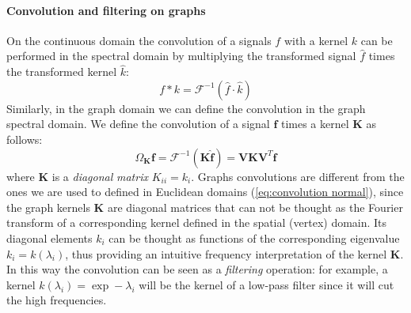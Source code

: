 \paragraph{Convolution and filtering on graphs}
On the continuous domain the convolution of a signals $f$ with a kernel $k$ can be performed in the spectral domain by multiplying the transformed signal $\hat f$ times the transformed kernel $\hat k$: 
\begin{equation}\label{eq:convolution normal}
	f*k = \mathcal F^{-1}(\hat f \cdot \hat k)
\end{equation}
Similarly, in the graph domain we can define the convolution in the graph spectral domain. We define the convolution of a signal $\mathbf f$ times a kernel $\mathbf K$ as follows:
\begin{equation}\label{eq:graph convolution}
	\Omega_\mathbf K\mathbf f = \mathcal{F}^{-1}(\mathbf K \hat {\mathbf f})= \mathbf V\mathbf K  \mathbf V^T {\mathbf f}
\end{equation}
where $\mathbf K$ is a \textit{diagonal} \textit{matrix} $K_{ii} = k_i$. Graphs convolutions are different from the ones we are used to defined in Euclidean domains (\ref{eq:convolution normal}), since the graph kernels $\mathbf K$ are diagonal matrices that can not be thought as the Fourier transform of a corresponding kernel defined in the spatial (vertex) domain. Its diagonal elements $k_{i}$ can be thought as functions of the corresponding eigenvalue $k_{i}= k(\lambda_i)$, thus providing an intuitive frequency interpretation of the kernel $\mathbf K$. In this way the convolution can be seen as a \textit{filtering} operation: for example, a kernel $k(\lambda_i) = \exp -\lambda_i$ will be the kernel of a low-pass filter since it will cut the high frequencies.

